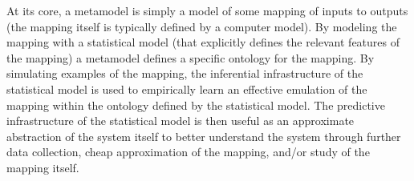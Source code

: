 %
At its core, a metamodel is simply a model of some mapping of inputs to outputs
(the mapping itself is typically defined by a computer model). By modeling the
mapping with a statistical model (that explicitly defines the relevant features of the
mapping) a metamodel defines a specific ontology for the mapping.
By simulating examples of the mapping, the inferential infrastructure of the
statistical model is used to empirically learn an effective emulation of the
mapping within the ontology defined by the statistical model. %
The predictive infrastructure of the statistical model is then useful as an
approximate abstraction of the system itself to better understand the system
through further data collection, cheap approximation of the mapping, and/or study
of the mapping itself.

